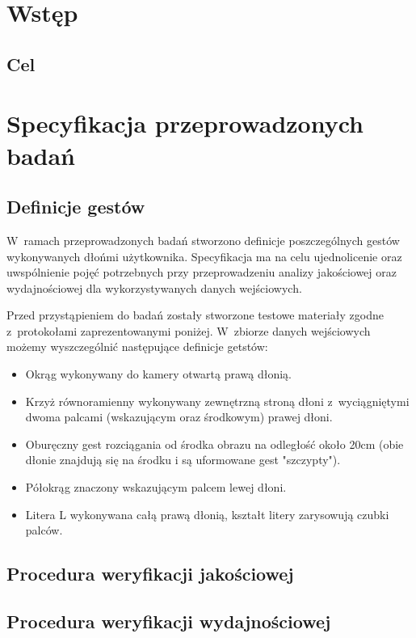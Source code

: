 \chapter{Wstęp}\label{Chapter_Wstep}

\section{Cel}\label{Section_Cel}

\chapter{Specyfikacja przeprowadzonych badań}\label{Chapter_SpecyfikacjaPrzeprowadzonychBadan}

\section{Definicje gestów}\label{Section_DefinicjeGestow}

W~ramach przeprowadzonych badań stworzono definicje poszczególnych gestów wykonywanych dłońmi użytkownika. Specyfikacja ma na celu ujednolicenie oraz uwspólnienie pojęć potrzebnych przy przeprowadzeniu analizy jakościowej oraz wydajnościowej dla wykorzystywanych danych wejściowych.

Przed przystąpieniem do badań zostały stworzone testowe materiały zgodne z~protokołami zaprezentowanymi poniżej. W~zbiorze danych wejściowych możemy wyszczególnić następujące definicje     getstów:

\begin{itemize}
  \item Okrąg wykonywany do kamery otwartą prawą dłonią.
  \item Krzyż równoramienny wykonywany zewnętrzną stroną dłoni z~wyciągniętymi dwoma palcami (wskazującym oraz środkowym) prawej dłoni.
  \item Oburęczny gest rozciągania od środka obrazu na odległość około 20cm (obie dłonie znajdują się na środku i są uformowane gest "szczypty").
  \item Półokrąg znaczony wskazującym palcem lewej dłoni.
  \item Litera L wykonywana całą prawą dłonią, kształt litery zarysowują czubki palców.
\end{itemize}

\section{Procedura weryfikacji jakościowej}\label{Section_ProceduraWeryfikacjiJakosciowej}

\section{Procedura weryfikacji wydajnościowej}\label{Section_ProceduraWeryfikacjiWydajnosciowej}